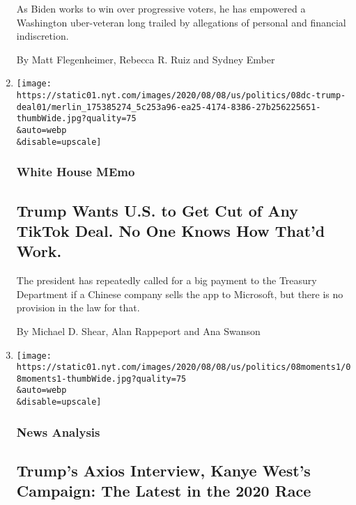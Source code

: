 \begin{enumerate}
  As Biden works to win over progressive voters, he has empowered a
  Washington uber-veteran long trailed by allegations of personal and
  financial indiscretion.

  By Matt Flegenheimer, Rebecca R. Ruiz and Sydney Ember
\item
  \href{/2020/08/08/us/politics/trump-tiktok-deal-treasury.html}{}

  \texttt{[image: https://static01.nyt.com/images/2020/08/08/us/politics/08dc-trump-deal01/merlin\_175385274\_5c253a96-ea25-4174-8386-27b256225651-thumbWide.jpg?quality=75\\\&auto=webp\\\&disable=upscale]}

  \hypertarget{white-house-memo}{%
  \subsubsection{White House MEmo}\label{white-house-memo}}

  \hypertarget{trump-wants-us-to-get-cut-of-any-tiktok-deal-no-one-knows-how-thatd-work}{%
  \subsection{Trump Wants U.S. to Get Cut of Any TikTok Deal. No One
  Knows How That'd
  Work.}\label{trump-wants-us-to-get-cut-of-any-tiktok-deal-no-one-knows-how-thatd-work}}

  The president has repeatedly called for a big payment to the Treasury
  Department if a Chinese company sells the app to Microsoft, but there
  is no provision in the law for that.

  By Michael D. Shear, Alan Rappeport and Ana Swanson
\item
  \href{/2020/08/08/us/politics/trump-biden-polls-interview.html}{}

  \texttt{[image: https://static01.nyt.com/images/2020/08/08/us/politics/08moments1/08moments1-thumbWide.jpg?quality=75\\\&auto=webp\\\&disable=upscale]}

  \hypertarget{news-analysis}{%
  \subsubsection{News Analysis}\label{news-analysis}}

  \hypertarget{trumps-axios-interview-kanye-wests-campaign-the-latest-in-the-2020-race}{%
  \subsection{Trump's Axios Interview, Kanye West's Campaign: The Latest
  in the 2020
  Race}\label{trumps-axios-interview-kanye-wests-campaign-the-latest-in-the-2020-race}}


\end{enumerate}
